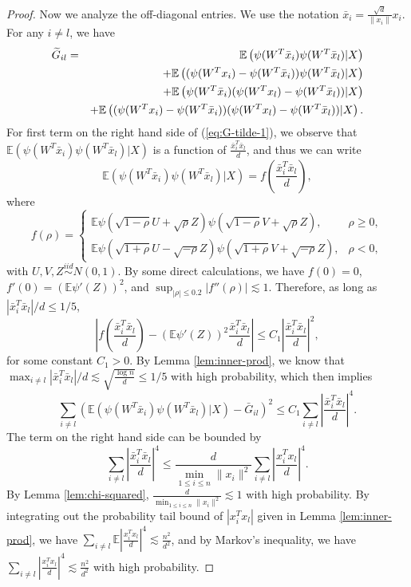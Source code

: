 \begin{proof}
Now we analyze the off-diagonal entries. We use the notation $\bar{x}_i=\frac{\sqrt{d}}{\|x_i\|}x_i$. For any $i\neq l$, we have
\begin{eqnarray}
\label{eq:G-tilde-1} \wt{G}_{il} &=& \mathbb{E}\left(\psi(W^T\bar{x}_i)\psi(W^T\bar{x}_l)|X\right) \\
\label{eq:G-tilde-2} && + \mathbb{E}\left((\psi(W^Tx_i)-\psi(W^T\bar{x}_i))\psi(W^T\bar{x}_l)|X\right) \\
\label{eq:G-tilde-3} && + \mathbb{E}\left(\psi(W^T\bar{x}_i)(\psi(W^Tx_l)-\psi(W^T\bar{x}_l))|X\right) \\
\label{eq:G-tilde-4} && + \mathbb{E}\left((\psi(W^Tx_i)-\psi(W^T\bar{x}_i))(\psi(W^Tx_l)-\psi(W^T\bar{x}_l))|X\right).
\end{eqnarray}
For first term on the right hand side of (\ref{eq:G-tilde-1}), we observe that $\mathbb{E}\left(\psi(W^T\bar{x}_i)\psi(W^T\bar{x}_l)|X\right)$ is a function of $\frac{\bar{x}_i^T\bar{x}_l}{d}$, and thus we can write
$$\mathbb{E}\left(\psi(W^T\bar{x}_i)\psi(W^T\bar{x}_l)|X\right)=f\left(\frac{\bar{x}_i^T\bar{x}_l}{d}\right),$$
where
$$f(\rho) = \begin{cases}
\mathbb{E}\psi(\sqrt{1-\rho}U+\sqrt{\rho}Z)\psi(\sqrt{1-\rho}V+\sqrt{\rho}Z), & \rho \geq 0, \\
\mathbb{E}\psi(\sqrt{1+\rho}U-\sqrt{-\rho}Z)\psi(\sqrt{1+\rho}V+\sqrt{-\rho}Z), & \rho < 0,
\end{cases}$$
with $U,V,Z\stackrel{iid}{\sim} N(0,1)$. By some direct calculations, we have $f(0)=0$, $f'(0)=(\mathbb{E}\psi'(Z))^2$, and $\sup_{|\rho|\leq 0.2}|f''(\rho)|\lesssim 1$. Therefore, as long as $|\bar{x}_i^T\bar{x}_l|/d\leq 1/5$,
$$\left|f\left(\frac{\bar{x}_i^T\bar{x}_l}{d}\right)-(\mathbb{E}\psi'(Z))^2\frac{\bar{x}_i^T\bar{x}_l}{d}\right|\leq C_1\left|\frac{\bar{x}_i^T\bar{x}_l}{d}\right|^2,$$
for some constant $C_1>0$. By Lemma \ref{lem:inner-prod}, we know that $\max_{i\neq l}|\bar{x}_i^T\bar{x}_l|/d\lesssim \sqrt{\frac{\log n}{d}}\leq 1/5$ with high probability, which then implies
\begin{equation}
\sum_{i\neq l}\left(\mathbb{E}\left(\psi(W^T\bar{x}_i)\psi(W^T\bar{x}_l)|X\right)-\bar{G}_{il}\right)^2 \leq C_1\sum_{i\neq l}\left|\frac{\bar{x}_i^T\bar{x}_l}{d}\right|^4. \label{eq:G-H}
\end{equation}
The term on the right hand side can be bounded by
$$\sum_{i\neq l}\left|\frac{\bar{x}_i^T\bar{x}_l}{d}\right|^4\leq \frac{d}{\min_{1\leq i\leq n}\|x_i\|^2}\sum_{i\neq l}\left|\frac{x_i^Tx_l}{d}\right|^4.$$
By Lemma \ref{lem:chi-squared}, $\frac{d}{\min_{1\leq i\leq n}\|x_i\|^2}\lesssim 1$ with high probability. By integrating out the probability tail bound of $|x_i^Tx_l|$ given in Lemma \ref{lem:inner-prod}, we have $\sum_{i\neq l}\mathbb{E}\left|\frac{x_i^Tx_l}{d}\right|^4\lesssim \frac{n^2}{d^2}$, and by Markov's inequality, we have $\sum_{i\neq l}\left|\frac{x_i^Tx_l}{d}\right|^4\lesssim \frac{n^2}{d^2}$ with high probability.



\end{proof}
